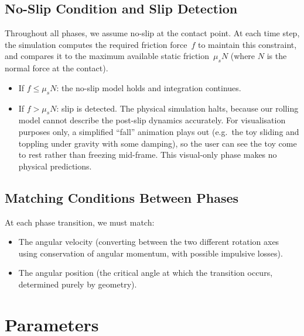 \documentclass[11pt,a4paper]{article}
\begin{document}
\subsection{No-Slip Condition and Slip Detection}

Throughout all phases, we assume no-slip at the contact point.  At each time step, the
simulation computes the required friction force~$f$ to maintain this constraint, and
compares it to the maximum available static friction~$\mu_s N$ (where $N$ is the normal
force at the contact).

\begin{itemize}[nosep]
  \item If $f \leq \mu_s N$: the no-slip model holds and integration continues.
  \item If $f > \mu_s N$: slip is detected.  The physical simulation halts, because our
        rolling model cannot describe the post-slip dynamics accurately.  For
        visualisation purposes only, a simplified ``fall'' animation plays out (e.g.\ the
        toy sliding and toppling under gravity with some damping), so the user can see the
        toy come to rest rather than freezing mid-frame.  This visual-only phase makes no
        physical predictions.
\end{itemize}

\subsection{Matching Conditions Between Phases}

At each phase transition, we must match:
\begin{itemize}[nosep]
  \item The angular velocity (converting between the two different rotation axes using
        conservation of angular momentum, with possible impulsive losses).
  \item The angular position (the critical angle at which the transition occurs, determined
        purely by geometry).
\end{itemize}

\section{Parameters}
\end{document}
